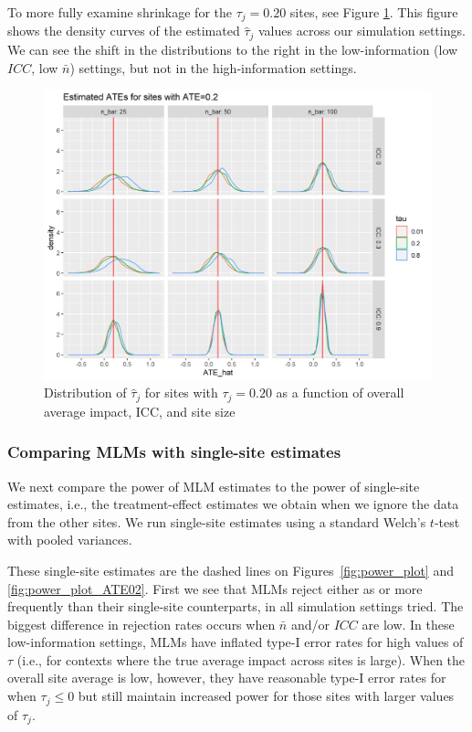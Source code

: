 \documentclass[]{article}
\begin{document}
To more fully examine shrinkage for the $\tau_j = 0.20$ sites, see Figure \ref{fig:power_plot_ATE02_dens}.
This figure shows the density curves of the estimated $\hat{\tau}_j$ values across our simulation settings.
We can see the shift in the distributions to the right in the low-information (low $ICC$, low $\bar{n}$) settings, but not in the high-information settings.

\begin{figure}[ht]
	\centering
	\includegraphics[width=\textwidth]{power_plot_ATE02_dens}
	\caption{Distribution of $\hat{\tau}_j$ for sites with $\tau_j = 0.20$ as a function of overall average impact, ICC, and site size}
	\label{fig:power_plot_ATE02_dens}
\end{figure}


\subsubsection{Comparing MLMs with single-site estimates}

We next compare the power of MLM estimates to the power of single-site estimates, i.e., the treatment-effect estimates we obtain when we ignore the data from the other sites.
We run single-site estimates using a standard Welch's $t$-test with pooled variances.

These single-site estimates are the dashed lines on Figures~\ref{fig:power_plot} and \ref{fig:power_plot_ATE02}.
First we see that MLMs reject either as or more frequently than their single-site counterparts, in all simulation settings tried.
The biggest difference in rejection rates occurs when $\bar{n}$ and/or $ICC$ are low.
In these low-information settings, MLMs have inflated type-I error rates for high values of $\tau$ (i.e., for contexts where the true average impact across sites is large).
When the overall site average is low, however, they have reasonable type-I error rates for when $\tau_j \leq 0$ but still maintain increased power for those sites with larger values of $\tau_j$.
\end{document}
